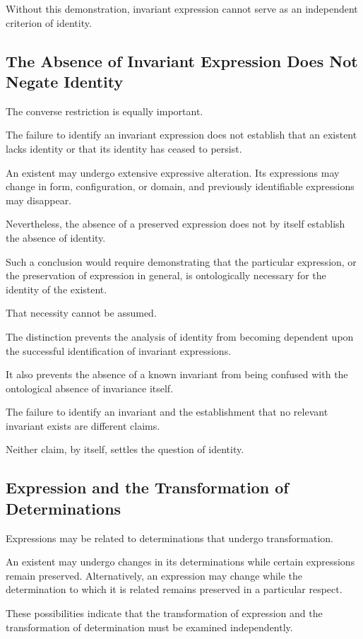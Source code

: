 Without this demonstration, invariant expression
cannot serve as an independent criterion of identity.

\subsection{The Absence of Invariant Expression Does Not Negate Identity}

The converse restriction is equally important.

The failure to identify an invariant expression
does not establish that an existent lacks identity
or that its identity has ceased to persist.

An existent may undergo extensive expressive
alteration. Its expressions may change in form,
configuration, or domain, and previously identifiable
expressions may disappear.

Nevertheless, the absence of a preserved expression
does not by itself establish the absence of identity.

Such a conclusion would require demonstrating
that the particular expression, or the preservation
of expression in general, is ontologically necessary
for the identity of the existent.

That necessity cannot be assumed.

The distinction prevents the analysis of identity
from becoming dependent upon the successful
identification of invariant expressions.

It also prevents the absence of a known invariant
from being confused with the ontological absence
of invariance itself.

The failure to identify an invariant and the
establishment that no relevant invariant exists
are different claims.

Neither claim, by itself, settles the question
of identity.

\subsection{Expression and the Transformation of Determinations}

Expressions may be related to determinations
that undergo transformation.

An existent may undergo changes in its determinations
while certain expressions remain preserved.
Alternatively, an expression may change while
the determination to which it is related remains
preserved in a particular respect.

These possibilities indicate that the transformation
of expression and the transformation of determination
must be examined independently.

